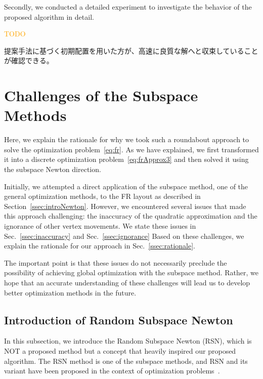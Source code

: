 \documentclass[dvipdfmx,journal]{IEEEtran}
\newcommand{\orange}[1]{\textcolor{orange}{#1}}
\begin{document}
Secondly, we conducted a detailed experiment to investigate the behavior of the proposed algorithm in detail.

\orange{TODO}

提案手法に基づく初期配置を用いた方が、高速に良質な解へと収束していることが確認できる。

\section{Challenges of the Subspace Methods}\label{sec:challenges}

Here, we explain the rationale for why we took such a roundabout approach to solve the optimization problem~\eqref{eq:fr}.
As we have explained, we first transformed it into a discrete optimization problem~\eqref{eq:frApprox3} and then solved it using the subspace Newton direction.

Initially, we attempted a direct application of the subspace method, one of the general optimization methods, to the FR layout as described in Section~\ref{ssec:introNewton}.
However, we encountered several issues that made this approach challenging: the inaccuracy of the quadratic approximation and the ignorance of other vertex movements. We state these issues in Sec.~\ref{ssec:inaccuracy} and Sec.~\ref{ssec:ignorance}
Based on these challenges, we explain the rationale for our approach in Sec.~\ref{ssec:rationale}.

The important point is that these issues do not necessarily preclude the possibility of achieving global optimization with the subspace method.
Rather, we hope that an accurate understanding of these challenges will lead us to develop better optimization methods in the future.

\subsection{Introduction of Random Subspace Newton}\label{ssec:introRSN}

In this subsection, we introduce the Random Subspace Newton (RSN), which is NOT a proposed method but a concept that heavily inspired our proposed algorithm.
The RSN method is one of the subspace methods, and RSN and its variant have been proposed in the context of optimization problems~\cite{NEURIPS2019_bc6dc48b,
  fujiRandomizedSubspaceRegularized2022,
  cartisRandomisedSubspaceMethods2022,
  nozawaRandomizedSubspaceGradient2023,
  higuchiFastConvergenceSecondOrder2024}.
\end{document}

